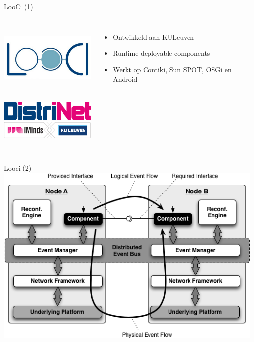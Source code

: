 \documentclass[presentation, bigger]{beamer}
\begin{document}
\begin{frame}[label=sec-2-3]{LooCi (1)}
\begin{columns}[t]
\centering
\includegraphics[width=5cm,height=3.5cm]{looci/looci.png}\\
\includegraphics[width=5cm,height=3cm]{looci/distrinet.png}
\centering
\begin{itemize}
\item Ontwikkeld aan KULeuven
\item Runtime deployable components
\item Werkt op Contiki, Sun SPOT, OSGi en Android
\end{itemize}
\end{columns}
\end{frame}

\begin{frame}[label=sec-2-4]{Looci (2)}
\includegraphics[width=\textwidth,keepaspectration=true]{looci/LooCIExecEnvironment.png}
\end{frame}
\end{document}
